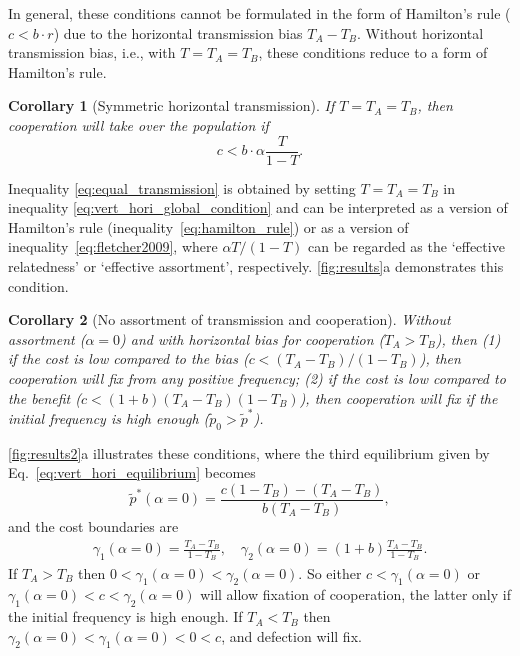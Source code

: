 \documentclass[12pt]{extarticle}
\newtheorem{corollary}{Corollary}
\begin{document}
{In general, these conditions cannot be formulated in the form of Hamilton's rule ($c<b\cdot r$) due to the horizontal transmission bias $T_A-T_B$.
Without horizontal transmission bias, i.e., with $T=T_A=T_B$, these conditions reduce to a form of Hamilton's rule.\\

\begin{corollary}[Symmetric horizontal transmission]
If $T=T_A=T_B$, then cooperation will take over the population if
\begin{equation}
\label{eq:equal_transmission}
c < b \cdot \alpha \frac{T}{1-T}.
\end{equation}
\end{corollary}
Inequality \ref{eq:equal_transmission} is obtained by setting $T=T_A=T_B$ in inequality \ref{eq:vert_hori_global_condition} and can be interpreted as a version of Hamilton's rule (inequality~\ref{eq:hamilton_rule}) or as a version of inequality~\ref{eq:fletcher2009}, where $\alpha T/(1-T)$ can be regarded as the `effective relatedness' or `effective assortment', respectively.
\autoref{fig:results}a demonstrates this condition. 
\\

\begin{corollary}[No assortment of transmission and cooperation]
Without assortment ($\alpha=0$) and with horizontal bias for cooperation ($T_A>T_B$), then 
(1) if the cost is low compared to the bias ($c<(T_A-T_B)/(1-T_B)$), then cooperation will fix from any positive frequency; 
(2) if the cost is low compared to the benefit ($c<(1+b)(T_A-T_B)(1-T_B)$), then cooperation will fix if the initial frequency is high enough ($\tilde{p}_0 > \tilde{p}^*$).
\end{corollary}

\autoref{fig:results2}a illustrates these conditions, where
 the third equilibrium given by Eq.\ \ref{eq:vert_hori_equilibrium} becomes
\begin{equation} \label{eq:vert_hori_alpha0_equilibrium}
\tilde{p}^*(\alpha=0) = \frac{c(1-T_B) - (T_A-T_B)}{b (T_A-T_B) },
\end{equation} 
and the cost boundaries are
\begin{equation}\begin{aligned}
\gamma_1(\alpha=0) = \frac{T_A - T_B}{1-T_B}, \quad
\gamma_2(\alpha=0) = (1+b)\frac{T_A - T_B}{1-T_B}.
\end{aligned}\end{equation}
If $T_A>T_B$ then $0<\gamma_1(\alpha=0)<\gamma_2(\alpha=0)$.
So either $c<\gamma_1(\alpha=0)$ or $\gamma_1(\alpha=0)<c<\gamma_2(\alpha=0)$ will allow fixation of cooperation, the latter only if the initial frequency is high enough.
If $T_A<T_B$ then $\gamma_2(\alpha=0)<\gamma_1(\alpha=0)<0<c$,
and defection will fix.
\\

}
\end{document}
